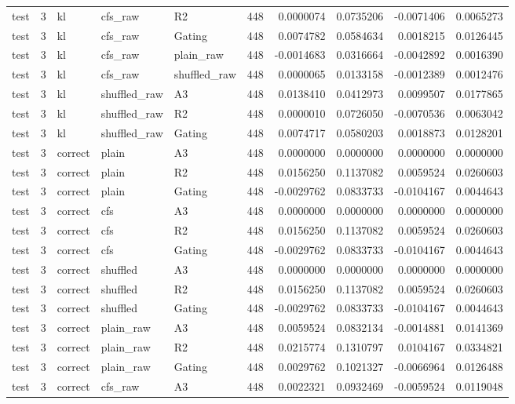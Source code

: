 \begin{tabular}{lrlllrrrrr}
test & 3 & kl & cfs_raw & R2 & 448 & 0.0000074 & 0.0735206 & -0.0071406 & 0.0065273 \\
test & 3 & kl & cfs_raw & Gating & 448 & 0.0074782 & 0.0584634 & 0.0018215 & 0.0126445 \\
test & 3 & kl & cfs_raw & plain_raw & 448 & -0.0014683 & 0.0316664 & -0.0042892 & 0.0016390 \\
test & 3 & kl & cfs_raw & shuffled_raw & 448 & 0.0000065 & 0.0133158 & -0.0012389 & 0.0012476 \\
test & 3 & kl & shuffled_raw & A3 & 448 & 0.0138410 & 0.0412973 & 0.0099507 & 0.0177865 \\
test & 3 & kl & shuffled_raw & R2 & 448 & 0.0000010 & 0.0726050 & -0.0070536 & 0.0063042 \\
test & 3 & kl & shuffled_raw & Gating & 448 & 0.0074717 & 0.0580203 & 0.0018873 & 0.0128201 \\
test & 3 & correct & plain & A3 & 448 & 0.0000000 & 0.0000000 & 0.0000000 & 0.0000000 \\
test & 3 & correct & plain & R2 & 448 & 0.0156250 & 0.1137082 & 0.0059524 & 0.0260603 \\
test & 3 & correct & plain & Gating & 448 & -0.0029762 & 0.0833733 & -0.0104167 & 0.0044643 \\
test & 3 & correct & cfs & A3 & 448 & 0.0000000 & 0.0000000 & 0.0000000 & 0.0000000 \\
test & 3 & correct & cfs & R2 & 448 & 0.0156250 & 0.1137082 & 0.0059524 & 0.0260603 \\
test & 3 & correct & cfs & Gating & 448 & -0.0029762 & 0.0833733 & -0.0104167 & 0.0044643 \\
test & 3 & correct & shuffled & A3 & 448 & 0.0000000 & 0.0000000 & 0.0000000 & 0.0000000 \\
test & 3 & correct & shuffled & R2 & 448 & 0.0156250 & 0.1137082 & 0.0059524 & 0.0260603 \\
test & 3 & correct & shuffled & Gating & 448 & -0.0029762 & 0.0833733 & -0.0104167 & 0.0044643 \\
test & 3 & correct & plain_raw & A3 & 448 & 0.0059524 & 0.0832134 & -0.0014881 & 0.0141369 \\
test & 3 & correct & plain_raw & R2 & 448 & 0.0215774 & 0.1310797 & 0.0104167 & 0.0334821 \\
test & 3 & correct & plain_raw & Gating & 448 & 0.0029762 & 0.1021327 & -0.0066964 & 0.0126488 \\
test & 3 & correct & cfs_raw & A3 & 448 & 0.0022321 & 0.0932469 & -0.0059524 & 0.0119048 \\

\end{tabular}
